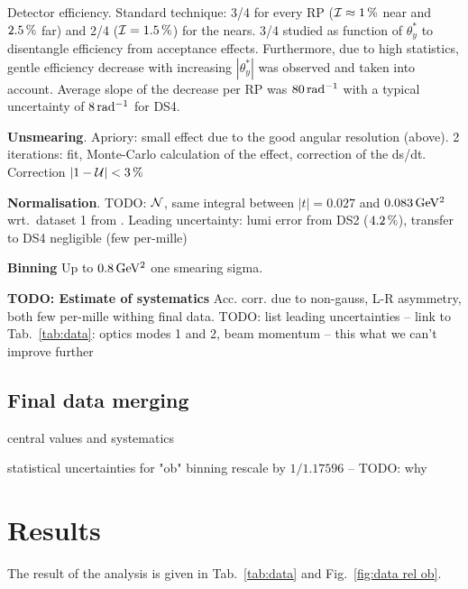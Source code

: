 \documentclass[TOTEM]{cern/cernphprep}
\def\un#1{\,{\rm #1}}
\def\hang{\hangindent=\parindent}
\def\>{\par\vskip\itskip\parindent\itindent\indent\hang\llap{\hbox to3mm{$\bullet$\hss}}}
\def\>E{\par\vskip\itskip\parindent\itindent\indent\hang\llap{\hbox to3mm{\hss}}}
\def\>>{\par\vskip\iitskip\parindent\iitindent\indent\hang\llap{\hbox to\iitindent{\hss--\ }}}
\begin{document}
Detector efficiency. Standard technique: 3/4 for every RP (${\cal I} \approx 1\un{\%}$ near and $2.5\un{\%}$ far) and 2/4 (${\cal I} = 1.5\un{\%}$) for the nears. 3/4 studied as function of $\theta_y^*$ to disentangle efficiency from acceptance effects. Furthermore, due to high statistics, gentle efficiency decrease with increasing $|\theta_y^*|$ was observed and taken into account. Average slope of the decrease per RP was $80\un{rad^{-1}}$ with a typical uncertainty of $8\un{rad^{-1}}$ for DS4.


{\bf Unsmearing}. Apriory: small effect due to the good angular resolution (above). 2 iterations: fit, Monte-Carlo calculation of the effect, correction of the ds/dt. Correction $|1 - {\cal U}| < 3\un{\%}$

{\bf Normalisation}. TODO: ${\cal N}$, same integral between $|t| = 0.027$ and $0.083\un{GeV^2}$ wrt.~dataset 1 from \cite{prl111}. Leading uncertainty: lumi error from DS2 ($4.2\un{\%}$), transfer to DS4 negligible (few per-mille)

{\bf Binning} Up to $0.8\un{GeV^2}$ one smearing sigma.

{\bf TODO: Estimate of systematics} Acc. corr. due to non-gauss, L-R asymmetry, both few per-mille withing final data. TODO: list leading uncertainties -- link to Tab.~\ref{tab:data}: optics modes 1 and 2, beam momentum -- this what we can't improve further

\subsection{Final data merging}

\> central values and systematics

\> statistical uncertainties for "ob" binning rescale by $1/1.17596$ -- TODO: why

\section{Results}

The result of the analysis is given in Tab.~\ref{tab:data} and Fig.~\ref{fig:data rel ob}.
\end{document}
